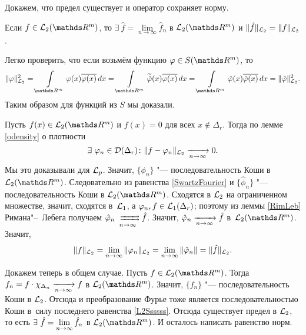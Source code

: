 Докажем, что предел существует и оператор сохраняет норму.
\begin{The}[Планшереля]
  Если $f\in\L_2(\R^m)$, то $\exists\ \hat f = \lim\limits_{n\to\infty} \hat f_n$ в $\L_2(\R^m)$ и $\|\hat f\|_{\mathcal L_2} = \|f\|_{\mathcal L_2}$.
\end{The}
\begin{Proof}
 Легко проверить, что если возьмём функцию $ \phi\in S(\R^m)$, то 
\begin{equation}\label{SwartzFourier}
  \|\phi\|_{\L_2}^2 = \Gint{\R^m}\phi(x)\ol{\phi(x)}\,dx = 
  \Gint{\R^m}\Til{\hat\phi}(x)\ol{\phi(x)}\,dx = 
  \Gint{\R^m}\hat \phi(x)\ol{\hat\phi(x)}\,dx = \|\hat\phi\|_{\L_2}^2.
\end{equation}
Таким образом для функций из $S$ мы доказали.

Пусть $f(x)\in\L_2(\R^m)$ и $f(x)=0$ для всех $x\not\in\Delta_r$. Тогда по лемме \ref{odensity} о плотности 
\[
  \exists\ \varphi_n\in\mathcal D(\Delta_r)\colon \|f-\varphi_n\|_{\mathcal L_2}\xrightarrow[n\rightarrow\infty]{}0.
\]
 Мы это доказывали для $\mathcal L_p$. Значит, $\{\phi_n\}$ "--- последовательность Коши в $\L_2(\R^m)$. Следовательно из равенства \eqref{SwartzFourier} и $\{\hat\phi_n\}$ "--- последовательность Коши в $\L_2(\R^m)$. Сходятся в $\mathcal L_2$ на ограниченном множестве, значит, сходятся в~$\mathcal L_1$, а $\varphi_n,f\in\mathcal L_1(\Delta_r)$; поэтому из леммы \ref{RimLeb} Римана"--~Лебега получаем $\hat\phi_n\rsh[ ] n\hat f$. Значит, $\hat{\varphi}_n\xrightarrow[n\rightarrow\infty]{} \hat f$ в~$\L_2(\R^m)$. Значит,
\begin{equation}\label{L2Ssssss}
  \|f\|_{\mathcal L_2} = \lim\limits_{n\rightarrow\infty}\|\varphi_n\|_{\mathcal L_2} = \lim\limits_{n\rightarrow\infty} \|\hat{\varphi}_n\| = \|\hat f\|_{\mathcal L_2}.
\end{equation}

Докажем теперь в общем случае. Пусть $f\in\L_2(\R^m)$. Тогда $f_n = f\cdot\chi_{\Delta_n}\xrightarrow[n\rightarrow\infty]{} f$ в $\L_2(\R^m)$. Значит, $\{f_n\}$ "--- последовательность Коши в $\mathcal L_2$. Отсюда и преобразование Фурье тоже является последовательностью Коши в~силу последнего равенства \eqref{L2Ssssss}. Отсюда существует предел в $\mathcal L_2$, то есть $\exists\ \hat f=\lim\limits_{n\rightarrow\infty} \hat f_n$ в $\L_2(\R^m)$. И осталось написать равенство норм.
\end{Proof}

